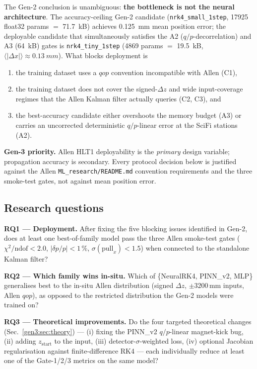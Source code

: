 \documentclass[a4paper,11pt]{article}
\newcommand{\SI}[2]{#1~#2}
\newcommand{\num}[1]{#1}
\newcommand{\kilo}{k}
\newcommand{\byte}{B}
\newcommand{\mm}{mm}
\newcommand{\dz}{\Delta z}
\begin{document}
The Gen-2 conclusion is unambiguous: \textbf{the bottleneck is not the
neural architecture}.  The accuracy-ceiling Gen-2 candidate
(\texttt{nrk4\_small\_1step}, \num{17925} float32 params $=$
\SI{71.7}{\kilo\byte}) achieves \SI{0.125}{\mm} mean position error;
the deployable candidate that simultaneously satisfies the A2
($q/p$-decorrelation) and A3 (\SI{64}{\kilo\byte}) gates is
\texttt{nrk4\_tiny\_1step} (\num{4869} params $=$ \SI{19.5}{\kilo\byte},
$\langle|\Delta x|\rangle \approx \SI{0.13}{\mm}$).  What blocks
deployment is

\begin{enumerate}
  \item the training dataset uses a $qop$ convention incompatible
        with Allen (C1),
  \item the training dataset does not cover the signed-$\dz$ and
        wide input-coverage regimes that the Allen Kalman filter
        actually queries (C2, C3), and
  \item the best-accuracy candidate either overshoots the memory
        budget (A3) or carries an uncorrected deterministic
        $q/p$-linear error at the SciFi stations (A2).
\end{enumerate}

\noindent\textbf{Gen-3 priority.}  Allen HLT1 deployability is the
\emph{primary} design variable; propagation accuracy is secondary.
Every protocol decision below is justified against the Allen
\texttt{ML\_research/README.md} convention requirements and the three
smoke-test gates, not against mean position error.

\subsection{Research questions}

\noindent\textbf{RQ1 --- Deployment.}  After fixing the five blocking
issues identified in Gen-2, does at least one best-of-family model
pass the three Allen smoke-test gates
($\chi^2/\mathrm{ndof}<2.0$, $|\delta p/p|<1\,\%$,
$\sigma(\mathrm{pull}_x)<1.5$) when connected to the standalone
Kalman filter?

\noindent\textbf{RQ2 --- Which family wins in-situ.}  Which of
\{NeuralRK4, PINN\_v2, MLP\} generalises best to the in-situ Allen
distribution (signed $\dz$, $\pm3200$\,mm inputs, Allen $qop$), as
opposed to the restricted distribution the Gen-2 models were trained
on?

\noindent\textbf{RQ3 --- Theoretical improvements.}  Do the four
targeted theoretical changes (Sec.~\ref{gen3:sec:theory}) --- (i)
fixing the PINN\_v2 $q/p$-linear magnet-kick bug, (ii) adding
$z_\mathrm{start}$ to the input, (iii) detector-$\sigma$-weighted
loss, (iv) optional Jacobian regularisation against finite-difference
RK4 --- each individually reduce at least one of the Gate-1/2/3
metrics on the same model?
\end{document}
